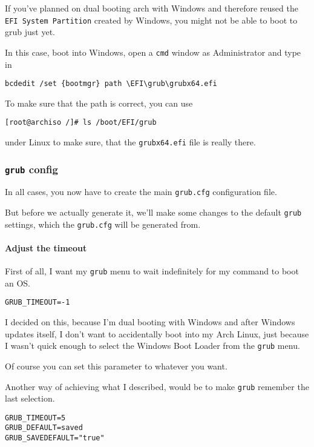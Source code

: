 \documentclass[9pt]{report}
\newenvironment{NOTE}
{\begin{tcolorbox}[colback=admonitionBG,coltitle=draculaFG,colframe=draculaBlue,colbacktitle=draculaBlue,title=NOTE]}
{\end{tcolorbox}}
\newenvironment{IMPORTANT}
{\begin{tcolorbox}[colback=admonitionBG,coltitle=draculaFG,colframe=draculaRed,colbacktitle=draculaRed,title=IMPORTANT]}
{\end{tcolorbox}}
\begin{document}
\begin{IMPORTANT}
    If you’ve planned on dual booting arch with Windows and therefore reused the \texttt{EFI System Partition} created by Windows, you might not be able to boot to grub just yet.


    In this case, boot into Windows, open a \texttt{cmd} window as Administrator and type in


    \begin{verbatim}
bcdedit /set {bootmgr} path \EFI\grub\grubx64.efi
    \end{verbatim}

    To make sure that the path is correct, you can use


    \begin{verbatim}
[root@archiso /]# ls /boot/EFI/grub
    \end{verbatim}

    under Linux to make sure, that the \texttt{grubx64.efi} file is really there.

\end{IMPORTANT}

\newpage

\hypertarget{x-grub-config}{\subsubsection{\texttt{grub} config}}
In all cases, you now have to create the main \texttt{grub.cfg} configuration file.


But before we actually generate it, we’ll make some changes to the default \texttt{grub} settings, which the \texttt{grub.cfg} will be generated from.



\newpage

\hypertarget{x-adjust-the-timeout}{\paragraph{Adjust the timeout}}
First of all, I want my \texttt{grub} menu to wait indefinitely for my command to boot an OS.


\begin{verbatim}
GRUB_TIMEOUT=-1
\end{verbatim}

\begin{NOTE}
    I decided on this, because I’m dual booting with Windows and after Windows updates itself, I don’t want to accidentally boot into my Arch Linux, just because I wasn’t quick enough to select the Windows Boot Loader from the \texttt{grub} menu.


    Of course you can set this parameter to whatever you want.


    Another way of achieving what I described, would be to make \texttt{grub} remember the last selection.


    \begin{verbatim}
GRUB_TIMEOUT=5
GRUB_DEFAULT=saved
GRUB_SAVEDEFAULT="true"
    \end{verbatim}
\end{NOTE}
\end{document}
